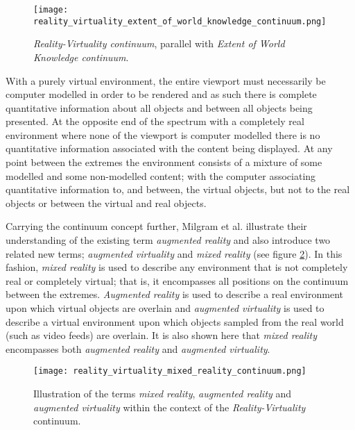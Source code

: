 \begin{figure}[h]
\centering
\texttt{[image: reality\_virtuality\_extent\_of\_world\_knowledge\_continuum.png]}
\caption{\textit{Reality-Virtuality continuum}, parallel with \textit{Extent of World Knowledge continuum}.}
\label{reality_virtuality_extent_of_world_knowledge_continuum}
\end{figure}

With a purely virtual environment, the entire viewport must necessarily be computer modelled in order to be rendered and as such there is complete quantitative information about all objects and between all objects being presented. At the opposite end of the spectrum with a completely real environment where none of the viewport is computer modelled there is no quantitative information associated with the content being displayed. At any point between the extremes the environment consists of a mixture of some modelled and some non-modelled content; with the computer associating quantitative information to, and between, the virtual objects, but not to the real objects or between the virtual and real objects.

Carrying the continuum concept further, Milgram et al. illustrate their understanding of the existing term \textit{augmented reality} and also introduce two related new terms; \textit{augmented virtuality} and \textit{mixed reality} (see figure \ref{reality_virtuality_mixed_reality_continuum.png}). In this fashion, \textit{mixed reality} is used to describe any environment that is not completely real or completely virtual; that is, it encompasses all positions on the continuum between the extremes. \textit{Augmented reality} is used to describe a real environment upon which virtual objects are overlain and \textit{augmented virtuality} is used to describe a virtual environment upon which objects sampled from the real world (such as video feeds) are overlain. It is also shown here that \textit{mixed reality} encompasses both \textit{augmented reality} and \textit{augmented virtuality}.

\begin{figure}[h]
\centering
\texttt{[image: reality\_virtuality\_mixed\_reality\_continuum.png]}
\caption{Illustration of the terms \textit{mixed reality}, \textit{augmented reality} and \textit{augmented virtuality} within the context of the \textit{Reality-Virtuality} continuum.}
\label{reality_virtuality_mixed_reality_continuum.png}
\end{figure}

